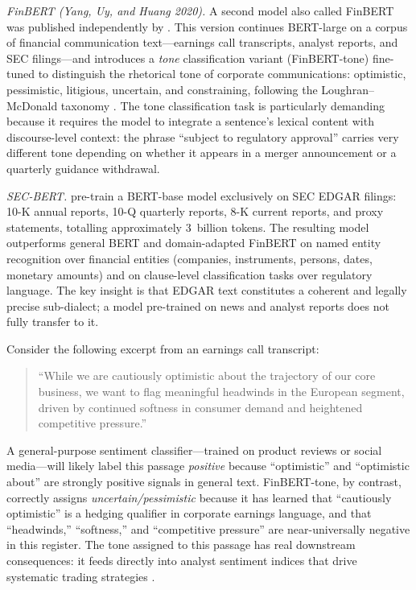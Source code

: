 \textit{FinBERT (Yang, Uy, and Huang 2020).}  A second model also called
FinBERT \cite{yang2020finbert} was published independently by
\citet{yang2020finbert}.  This version continues BERT-large on a corpus of
financial communication text---earnings call transcripts, analyst reports, and
SEC filings---and introduces a \emph{tone} classification variant
(FinBERT-tone) fine-tuned to distinguish the rhetorical tone of corporate
communications: optimistic, pessimistic, litigious, uncertain, and constraining,
following the Loughran--McDonald taxonomy \cite{loughran2011liability}.  The
tone classification task is particularly demanding because it requires the model
to integrate a sentence's lexical content with discourse-level context: the phrase
``subject to regulatory approval'' carries very different tone depending on whether
it appears in a merger announcement or a quarterly guidance withdrawal.

\textit{SEC-BERT.}  \citet{loukas2022secbert} pre-train a BERT-base model
exclusively on SEC EDGAR filings: 10-K annual reports, 10-Q quarterly reports,
8-K current reports, and proxy statements, totalling approximately 3~billion
tokens.  The resulting model outperforms general BERT and domain-adapted FinBERT
on named entity recognition over financial entities (companies, instruments,
persons, dates, monetary amounts) and on clause-level classification tasks over
regulatory language.  The key insight is that EDGAR text constitutes a coherent
and legally precise sub-dialect; a model pre-trained on news and analyst reports
does not fully transfer to it.

\begin{example}
\label{ex:ch08-finbert-earnings}
Consider the following excerpt from an earnings call transcript:

\begin{quote}
``While we are cautiously optimistic about the trajectory of our core business,
we want to flag meaningful headwinds in the European segment, driven by
continued softness in consumer demand and heightened competitive pressure.''
\end{quote}

A general-purpose sentiment classifier---trained on product reviews or social
media---will likely label this passage \textit{positive} because ``optimistic''
and ``optimistic about'' are strongly positive signals in general text.
FinBERT-tone, by contrast, correctly assigns \textit{uncertain/pessimistic}
because it has learned that ``cautiously optimistic'' is a hedging qualifier
in corporate earnings language, and that ``headwinds,'' ``softness,'' and
``competitive pressure'' are near-universally negative in this register.
The tone assigned to this passage has real downstream consequences: it feeds
directly into analyst sentiment indices that drive systematic trading strategies
\cite{tetlock2007giving}.
\end{example}

